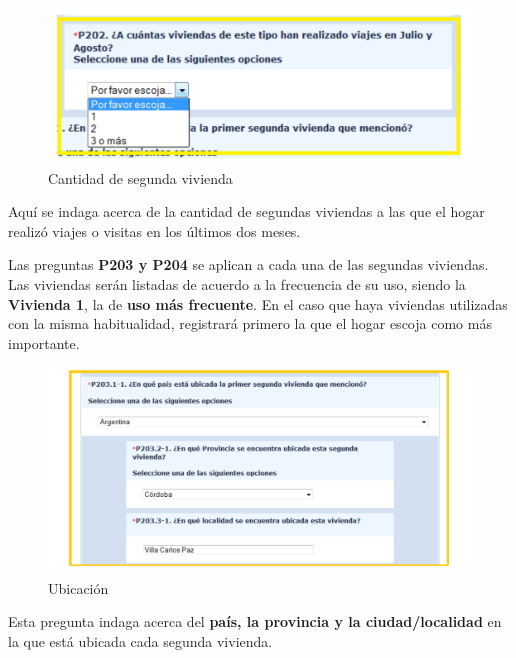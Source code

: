 \documentclass[
  openany]{book}
\begin{document}
\begin{figure}

{\centering \includegraphics[width=1\linewidth]{imagenes/figura6-66} 

}

\caption{Cantidad de segunda vivienda}\label{fig:respuesfinal2}
\end{figure}

Aquí se indaga acerca de la cantidad de segundas viviendas a las que el hogar realizó viajes o visitas en los últimos dos meses.

Las preguntas \textbf{P203 y P204} se aplican a cada una de las segundas viviendas. Las viviendas serán listadas de acuerdo a la frecuencia de su uso, siendo la \textbf{Vivienda 1}, la de \textbf{uso más frecuente}. En el caso que haya viviendas utilizadas con la misma habitualidad, registrará primero la que el hogar escoja como más importante.

\begin{figure}

{\centering \includegraphics[width=1\linewidth]{imagenes/figura6-67} 

}

\caption{Ubicación}\label{fig:ubi}
\end{figure}

Esta pregunta indaga acerca del \textbf{país, la provincia y la ciudad/localidad} en la que está ubicada cada segunda vivienda.
\end{document}
